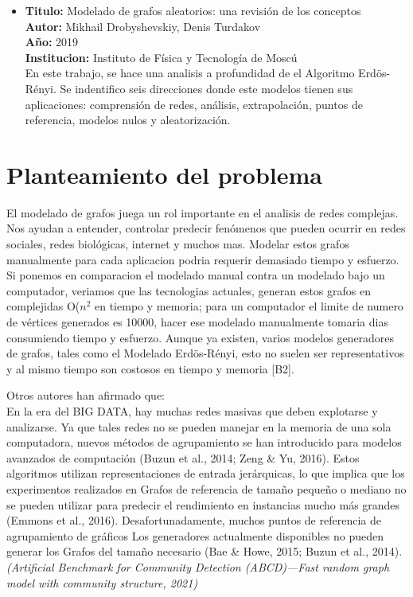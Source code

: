\documentclass[11pt]{extarticle}
\begin{document}
\begin{itemize}
  \item \textbf{Titulo:} Modelado de grafos aleatorios: una revisión de los conceptos\\
  \textbf{Autor:} Mikhail Drobyshevskiy, Denis Turdakov\\
  \textbf{A\~no:} 2019\\
  \textbf{Institucion:} Instituto de Física y Tecnología de Moscú\\
  En este trabajo, se hace una analisis a profundidad de el Algoritmo Erdös-Rényi.
  Se indentifico seis direcciones donde este modelos tienen sus aplicaciones: comprensión de redes, análisis, extrapolación, puntos de referencia, modelos nulos y aleatorización. 

\end{itemize}



\section{Planteamiento del problema}
  El modelado de grafos juega un rol importante en el analisis de redes complejas. 
  Nos ayudan a entender, controlar predecir fen\'omenos que pueden ocurrir en redes sociales, 
  redes biol\'ogicas, internet y muchos mas. Modelar estos grafos manualmente para cada aplicacion podria requerir
  demasiado tiempo y esfuerzo. Si ponemos en comparacion el modelado manual contra un modelado bajo un computador,
  veriamos que las tecnologias actuales, generan estos grafos en complejidas O(\(n^2\) en tiempo y memoria; 
  para un computador el limite de numero de v\'ertices generados es 10000, hacer ese modelado manualmente tomaria dias
  consumiendo tiempo y esfuerzo. Aunque ya existen, varios modelos generadores de grafos, tales como el Modelado  Erdös-Rényi, esto no suelen ser representativos
  y al mismo tiempo son costosos en tiempo y memoria [B2].\hfill\break

  Otros autores han afirmado que:\\
  En la era del BIG DATA, hay muchas redes masivas que deben explotarse y analizarse. Ya que
  tales redes no se pueden manejar en la memoria de una sola computadora, nuevos métodos de agrupamiento
  se han introducido para modelos avanzados de computación (Buzun et al., 2014; Zeng & Yu, 2016).
  Estos algoritmos utilizan representaciones de entrada jerárquicas, lo que implica que los experimentos realizados en Grafos de referencia de tamaño pequeño o mediano no se pueden utilizar para predecir el rendimiento en instancias mucho más grandes (Emmons et al., 2016). Desafortunadamente, muchos puntos de referencia de agrupamiento de gráficos
  Los generadores actualmente disponibles no pueden generar los Grafos del tamaño necesario (Bae & Howe,
  2015; Buzun et al., 2014).
  \textit{ (Artificial Benchmark for Community Detection (ABCD)—Fast random graph model with community structure, 2021)}
\end{document}
